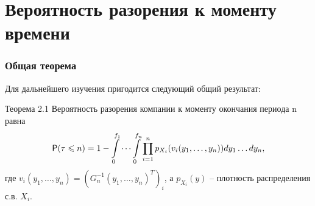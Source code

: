 \documentclass[10pt]{beamer}
\newcommand{\p}{{\sf P}}
\theoremstyle{definition}
\theoremstyle{remark}
\begin{document}

\section{Вероятность разорения к моменту времени}
\begin{frame}\frametitle{Общая теорема}
	Для дальнейшего изучения пригодится следующий общий результат:
	\begin{block}{Теорема 2.1}
		Вероятность разорения компании к моменту окончания периода n равна 
		\begin{equation}
			\p(\tau \leqslant n) = 1 - \int\limits_0^{f_1}\cdots \int\limits_0^{f_n} \prod\limits_{i=1}^n p_{X_i} (v_i(y_1, \ldots, y_n))  dy_1 \ldots dy_n,
		\end{equation}
	где $v_i(y_1, \ldots, y_n) = \left(G_n^{-1} (y_1,\ldots, y_n)^T \right)_i$, а $p_{X_i}(y)$ -- плотность распределения с.в. $X_i$.
	\end{block}
\end{frame}
\end{document}
